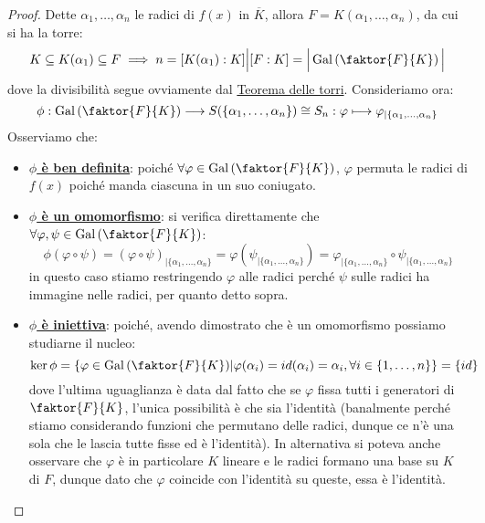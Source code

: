 \documentclass[11pt]{scrartcl}
\begin{document}
\begin{proof}
    Dette $\alpha_1,\ldots,\alpha_n$ le radici di $f(x)$ in $\overline K$, allora $F = K(\alpha_1,\ldots,\alpha_n)$, da cui si ha la torre:
    \[ K \subseteq K(\alpha_1) \subseteq F \implies n = [K(\alpha_1) : K] \Big| [F : K] = \Big|\Gal\left(\faktor{F}{K}\right)\Big|
        \]
    dove la divisibilità segue ovviamente dal \hyperref[torri]{Teorema delle torri}. Consideriamo ora:
    \[ \phi: \Gal\left(\faktor{F}{K}\right) \longrightarrow S(\{\alpha_1,\ldots,\alpha_n\}) \cong S_n : \varphi \longmapsto \varphi_{|\{\alpha_1,\ldots,\alpha_n\}}
        \]
    Osserviamo che:
    \begin{itemize}
        \item \underline{\textbf{$\phi$ è ben definita}}: poiché $\forall \varphi \in \Gal\left(\faktor{F}{K}\right)$, $\varphi$ permuta le radici di $f(x)$ poiché manda ciascuna in un suo coniugato.
        \item \underline{\textbf{$\phi$ è un omomorfismo}}: si verifica direttamente che $\forall \varphi,\psi \in \Gal\left(\faktor{F}{K}\right)$:
        \[ \phi(\varphi \circ \psi) = (\varphi \circ \psi)_{|{\{\alpha_1,\ldots,\alpha_n\}}} = \varphi(\psi_{|{\{\alpha_1,\ldots,\alpha_n\}}}) = \varphi_{|{\{\alpha_1,\ldots,\alpha_n\}}} \circ \psi_{|{\{\alpha_1,\ldots,\alpha_n\}}}
            \]
        in questo caso stiamo restringendo $\varphi$ alle radici perché $\psi$ sulle radici ha immagine nelle radici, per quanto detto sopra.    
        \item \underline{\textbf{$\phi$ è iniettiva}}: poiché, avendo dimostrato che è un omomorfismo possiamo studiarne il nucleo:
        \[ \ker \phi = \left\{\varphi \in \Gal\left(\faktor{F}{K}\right) \m \varphi(\alpha_i) = id(\alpha_i) = \alpha_i, \forall i \in \{1,\ldots,n\}\right\} = \{id\}
            \]
        dove l'ultima uguaglianza è data dal fatto che se $\varphi$ fissa tutti i generatori di $\faktor{F}{K}$, l'unica possibilità è che sia l'identità (banalmente perché stiamo considerando funzioni che permutano delle radici,
        dunque ce n'è una sola che le lascia tutte fisse ed è l'identità). In alternativa si poteva anche osservare che $\varphi$ è in particolare $K$ lineare e le radici formano una base su $K$ di $F$, dunque dato che $\varphi$ coincide
        con l'identità su queste, essa è l'identità.
    \end{itemize}
\end{proof}
\end{document}

